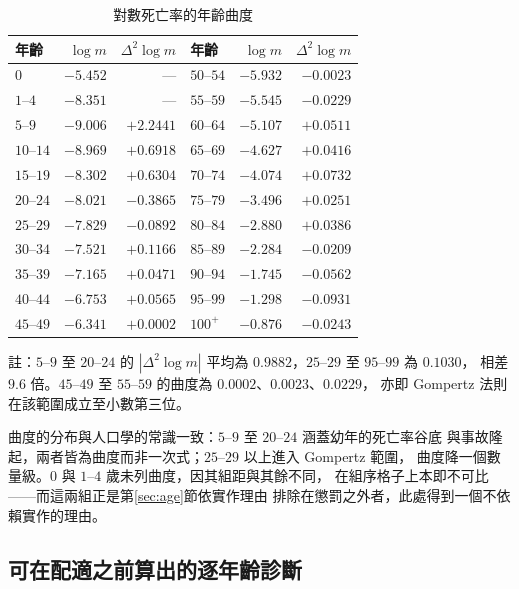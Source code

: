 \documentclass[UTF8, fontset=macnew, a4paper, 12pt]{ctexart}
\begin{document}
\begin{table}[H]
\centering
\caption{對數死亡率的年齡曲度}
\small
\renewcommand{\arraystretch}{1.05}
\begin{tabular}{lrr|lrr}
\toprule
年齡 & $\log m$ & $\Delta^2\log m$ & 年齡 & $\log m$ & $\Delta^2\log m$\\
\midrule
0      & $-5.452$ & —        & $50$--$54$ & $-5.932$ & $-0.0023$\\
$1$--$4$   & $-8.351$ & —        & $55$--$59$ & $-5.545$ & $-0.0229$\\
$5$--$9$   & $-9.006$ & $+2.2441$ & $60$--$64$ & $-5.107$ & $+0.0511$\\
$10$--$14$ & $-8.969$ & $+0.6918$ & $65$--$69$ & $-4.627$ & $+0.0416$\\
$15$--$19$ & $-8.302$ & $+0.6304$ & $70$--$74$ & $-4.074$ & $+0.0732$\\
$20$--$24$ & $-8.021$ & $-0.3865$ & $75$--$79$ & $-3.496$ & $+0.0251$\\
$25$--$29$ & $-7.829$ & $-0.0892$ & $80$--$84$ & $-2.880$ & $+0.0386$\\
$30$--$34$ & $-7.521$ & $+0.1166$ & $85$--$89$ & $-2.284$ & $-0.0209$\\
$35$--$39$ & $-7.165$ & $+0.0471$ & $90$--$94$ & $-1.745$ & $-0.0562$\\
$40$--$44$ & $-6.753$ & $+0.0565$ & $95$--$99$ & $-1.298$ & $-0.0931$\\
$45$--$49$ & $-6.341$ & $+0.0002$ & $100^{+}$  & $-0.876$ & $-0.0243$\\
\bottomrule
\end{tabular}

\vspace{2pt}
\parbox{0.92\textwidth}{\footnotesize 註：$5$--$9$ 至 $20$--$24$ 的
$|\Delta^2\log m|$ 平均為 $0.9882$，$25$--$29$ 至 $95$--$99$ 為 $0.1030$，
相差 $9.6$ 倍。$45$--$49$ 至 $55$--$59$ 的曲度為 $0.0002$、$0.0023$、$0.0229$，
亦即 Gompertz 法則在該範圍成立至小數第三位。}
\label{tab:curv}
\end{table}

曲度的分布與人口學的常識一致：$5$--$9$ 至 $20$--$24$ 涵蓋幼年的死亡率谷底
與事故隆起，兩者皆為曲度而非一次式；$25$--$29$ 以上進入 Gompertz 範圍，
曲度降一個數量級。$0$ 與 $1$--$4$ 歲未列曲度，因其組距與其餘不同，
在組序格子上本即不可比——而這兩組正是第\ref{sec:age}節依實作理由
排除在懲罰之外者，此處得到一個不依賴實作的理由。

\subsection{可在配適之前算出的逐年齡診斷}\label{subsec:exante}
\end{document}
